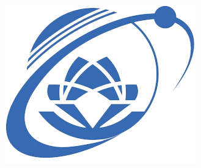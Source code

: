 \documentclass[14pt]{article}
\begin{document}
\begin{titlepage}




\includegraphics{logo-uit.png}\\ %
 

\vfill %

\end{titlepage}

\newpage
\tableofcontents
\end{document}
